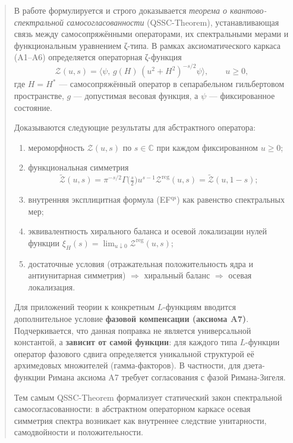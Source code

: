 \documentclass{article}
\numberwithin{equation}{section}
\theoremstyle{plain}
\theoremstyle{definition}
\theoremstyle{remark}
\def\Rightarrow{⇒}%
\begin{document}
\begin{abstract}
\noindent
В работе формулируется и строго доказывается \emph{теорема о квантово-спектральной самосогласованности} (QSSC-Theorem), устанавливающая связь между самосопряжёнными операторами, их спектральными мерами и функциональным уравнением ζ-типа. 
В рамках аксиоматического каркаса (A1–A6) определяется операторная ζ-функция
\begin{equation}
\mathcal Z(u,s)=\langle\psi,\,g(H)\,(u^2+H^2)^{-s/2}\psi\rangle,\qquad u\ge0,
\label{eq:QSSC0001}
\end{equation}
где $H=H^\ast$ — самосопряжённый оператор в сепарабельном гильбертовом пространстве, $g$ — допустимая весовая функция, а $\psi$ — фиксированное состояние. 

Доказываются следующие результаты для абстрактного оператора:
\begin{enumerate}
  \item мероморфность $\mathcal Z(u,s)$ по $s\in\mathbb C$ при каждом фиксированном $u\ge0$;
  \item функциональная симметрия
\begin{equation}
  \widetilde{\mathcal Z}(u,s)
  =\pi^{-s/2}\Gamma\!\big(\tfrac{s}{2}\big)u^{s-1}\mathcal Z^{\mathrm{reg}}(u,s)
  =\widetilde{\mathcal Z}(u,1-s);
\label{eq:QSSC0002}
\end{equation}
  \item внутренняя эксплицитная формула (EF$^{\mathrm{qs}}$) как равенство спектральных мер;
  \item эквивалентность хирального баланса и осевой локализации нулей функции
  $\xi_H(s)=\lim_{u\downarrow0}\mathcal Z^{\mathrm{reg}}(u,s)$;
  \item достаточные условия (отражательная положительность ядра и антиунитарная симметрия) $\Rightarrow$ хиральный баланс $\Rightarrow$ осевая локализация.
\end{enumerate}

Для приложений теории к конкретным $L$-функциям вводится дополнительное условие \textbf{фазовой компенсации (аксиома A7)}. Подчеркивается, что данная поправка не является универсальной константой, а \textbf{зависит от самой функции}: для каждого типа $L$-функции оператор фазового сдвига определяется уникальной структурой её архимедовых множителей (гамма-факторов). В частности, для дзета-функции Римана аксиома A7 требует согласования с фазой Римана-Зигеля.

Тем самым QSSC-Theorem формализует статический закон спектральной самосогласованности: в абстрактном операторном каркасе осевая симметрия спектра возникает как внутреннее следствие унитарности, самодвойности и положительности.


\end{abstract}
\end{document}
